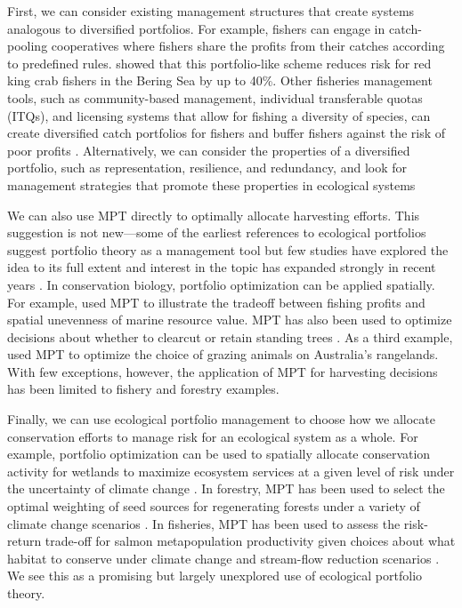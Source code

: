 First, we can consider existing management structures that create systems analogous to diversified portfolios. For example, fishers can engage in catch-pooling cooperatives where fishers share the profits from their catches according to predefined rules. \citet{sethi2012} showed that this portfolio-like scheme reduces risk for red king crab fishers in the Bering Sea by up to 40\%. Other fisheries management tools, such as community-based management, individual transferable quotas (ITQs), and licensing systems that allow for fishing a diversity of species, can create diversified catch portfolios for fishers and buffer fishers against the risk of poor profits \citep{hilborn2001, kasperski2013}. Alternatively, we can consider the properties of a diversified portfolio, such as representation, resilience, and redundancy, and look for management strategies that promote these properties in ecological systems \citep{haak2012}

We can also use MPT directly to optimally allocate harvesting efforts. This suggestion is not new---some of the earliest references to ecological portfolios suggest portfolio theory as a management tool \citep{baldursson1997, costanza2000} but few studies have explored the idea to its full extent and interest in the topic has expanded strongly in recent years \citep[e.g.][]{edwards2004, sanchirico2008, halpern2011, moloney2011}. In conservation biology, portfolio optimization can be applied spatially. For example, \citet{halpern2011} used MPT to illustrate the tradeoff between fishing profits and spatial unevenness of marine resource value. MPT has also been used to optimize decisions about whether to clearcut or retain standing trees \citep{hyytiainen2008, hildebrandt2011}. As a third example, \citet{moloney2011} used MPT to optimize the choice of grazing animals on Australia's rangelands. With few exceptions, however, the application of MPT for harvesting decisions has been limited to fishery and forestry examples.

Finally, we can use ecological portfolio management to choose how we allocate conservation efforts to manage risk for an ecological system as a whole. For example, portfolio optimization can be used to spatially allocate conservation activity for wetlands to maximize ecosystem services at a given level of risk under the uncertainty of climate change \citep{ando2011, ando2012}. In forestry, MPT has been used to select the optimal weighting of seed sources for regenerating forests under a variety of climate change scenarios \citep{crowe2008}. In fisheries, MPT has been used to assess the risk-return trade-off for salmon metapopulation productivity given choices about what habitat to conserve under climate change and stream-flow reduction scenarios \citep{anderson2014}. We see this as a promising but largely unexplored use of ecological portfolio theory.

